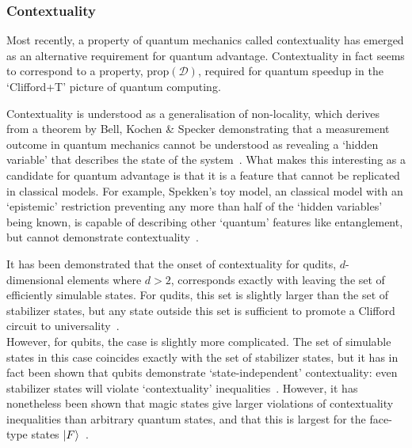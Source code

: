 \documentclass{standalone}
\begin{document}
\subsubsection{Contextuality}\label{sec:context}
Most recently, a property of quantum mechanics called contextuality has emerged as an alternative requirement for quantum advantage. Contextuality in fact seems to correspond to a property, $\text{prop}\left(\mathcal{D}\right)$, required for quantum speedup in the `Clifford+T' picture of quantum computing.
\par
Contextuality is understood as a generalisation of non-locality, which derives from a theorem by Bell, Kochen \& Specker demonstrating that a measurement outcome in quantum mechanics cannot be understood as revealing a `hidden variable' that describes the state of the system~\cite{Howard2014}. What makes this interesting as a candidate for quantum advantage is that it is a feature that cannot be replicated in classical models. For example, Spekken's toy model, an classical model with an `epistemic' restriction preventing any more than half of the `hidden variables' being known, is capable of describing other `quantum' features like entanglement, but cannot demonstrate contextuality~\cite{Spekkens2007}. 
\par
It has been demonstrated that the onset of contextuality for qudits, $d$-dimensional elements where $d>2$, corresponds exactly with leaving the set of efficiently simulable states. For qudits, this set is slightly larger than the set of stabilizer states, but any state outside this set is sufficient to promote a Clifford circuit to universality~\cite{Howard2014}.\\
However, for qubits, the case is slightly more complicated. The set of simulable states in this case coincides exactly with the set of stabilizer states, but it has in fact been shown that qubits demonstrate `state-independent' contextuality: even stabilizer states will violate `contextuality' inequalities~\cite{Howard2014}. However, it has nonetheless been shown that magic states give larger violations of contextuality inequalities than arbitrary quantum states, and that this is largest for the face-type states $\ket{F}$~\cite{Howard2014}.

\ifstandalone 

\fi
\end{document}
